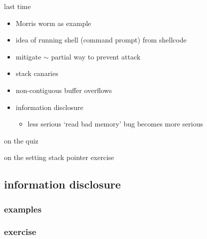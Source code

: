 \date{}
\title{}
\date{}

\begin{frame}
    \titlepage
\end{frame}





\begin{frame}{last time}
    \begin{itemize}
    \item Morris worm as example
    \item idea of running shell (command prompt) from shellcode
    \vspace{.5cm}
    \item mitigate $\sim$ partial way to prevent attack
    \item stack canaries
    \item non-contiguous buffer overflows
    \item information disclosure
        \begin{itemize}
        \item less serious `read bad memory' bug becomes more serious
        \end{itemize}
    \end{itemize}
\end{frame}

\begin{frame}{on the quiz}
\end{frame}

\begin{frame}{on the setting stack pointer exercise}
\end{frame}



\subsection{information disclosure}
\subsubsection{examples}


\subsubsection{exercise}


